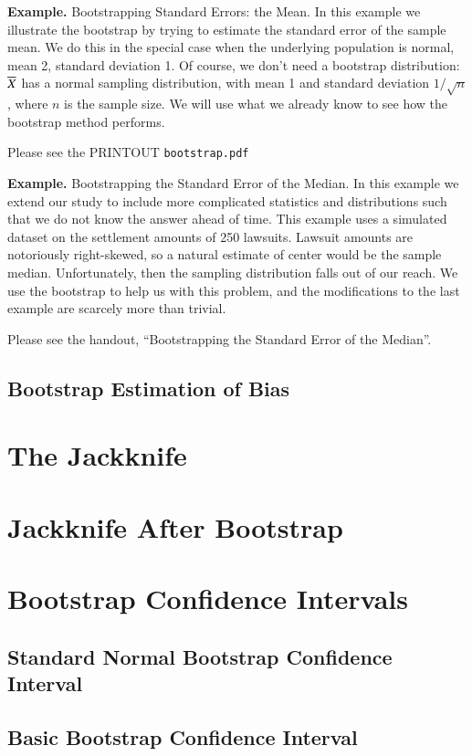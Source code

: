 \documentclass[captions=tableheading]{scrbook}
\begin{document}
\textbf{Example.} Bootstrapping Standard Errors: the Mean.  In this example we illustrate the bootstrap by trying to estimate the standard error of the sample mean. We do this in the special case when the underlying population is normal, mean 2, standard deviation 1. Of course, we don't need a bootstrap distribution: $\overline{X}$ has a normal sampling distribution, with mean 1 and standard deviation $1/\sqrt{n}$, where $n$ is the sample size. We will use what we already know to see how the bootstrap method performs.

Please see the PRINTOUT \texttt{bootstrap.pdf}


\textbf{Example.} Bootstrapping the Standard Error of the Median. In this example we extend our study to include more complicated statistics and distributions such that we do not know the answer ahead of time. This example uses a simulated dataset on the settlement amounts of 250 lawsuits. Lawsuit amounts are notoriously right-skewed, so a natural estimate of center would be the sample median. Unfortunately, then the sampling distribution falls out of our reach. We use the bootstrap to help us with this problem, and the modifications to the last example are scarcely more than trivial.

 

Please see the handout, ``Bootstrapping the Standard Error of the Median''.  


 
\subsection{Bootstrap Estimation of Bias}
\label{sec-4_2_2}
\section{The Jackknife}
\label{sec-4_3}
\section{Jackknife After Bootstrap}
\label{sec-4_4}
\section{Bootstrap Confidence Intervals}
\label{sec-4_5}
\subsection{Standard Normal Bootstrap Confidence Interval}
\label{sec-4_5_1}
\subsection{Basic Bootstrap Confidence Interval}
\label{sec-4_5_2}
\end{document}

